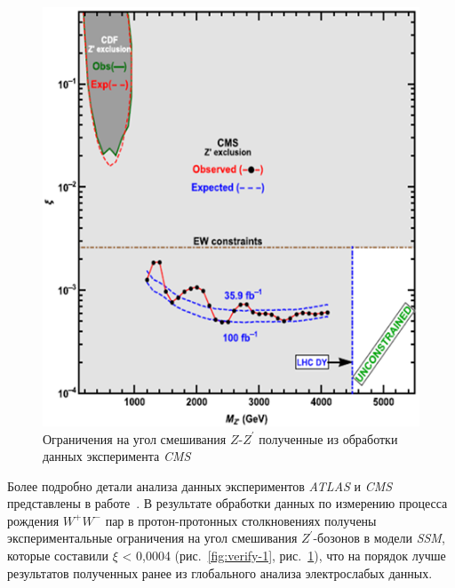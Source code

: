 \begin{figure}[!h]
	\centering
	\includegraphics[width=\textwidth]{figures/verify-2.png}
	\caption{Ограничения на угол смешивания $Z$-${Z}^{\prime}$ полученные из обработки данных эксперимента \textit{CMS}}
	\label{fig:verify-2}
\end{figure}

Более подробно детали анализа данных экспериментов \textit{ATLAS} и \textit{CMS} представлены в работе~\cite{2part-pankov}. В результате обработки данных по измерению процесса рождения ${W}^{+}{W}^{-}$ пар в протон-протонных столкновениях получены экспериментальные ограничения на угол смешивания ${Z}^{\prime}$-бозонов в модели \textit{SSM}, которые составили $\xi$ < 0,0004 (рис.~\ref{fig:verify-1}, рис.~\ref{fig:verify-2}), что на порядок лучше результатов полученных ранее из глобального анализа электрослабых данных.